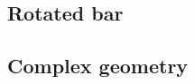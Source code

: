 %
\subsection{Rotated bar}
\label{section:rotated_bar}
%

%
\subsection{Complex geometry}
\label{section:complex_geometry}
%
